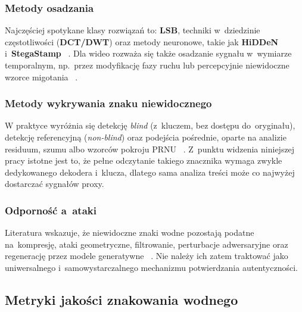 \subsubsection{Metody osadzania}
\label{sec:watermark_embed}

Najcz\k{e}\'{s}ciej spotykane klasy rozwi\k{a}za\'{n} to:
\textbf{LSB}, techniki w~dziedzinie cz\k{e}stotliwo\'{s}ci
(\textbf{DCT/DWT}) oraz metody neuronowe, takie jak
\textbf{HiDDeN} i~\textbf{StegaStamp}
~\cite{Zhu2018HiDDeN,Fernandez2024BlindWatermark}.
Dla wideo rozwa\.{z}a si\k{e} tak\.{z}e osadzanie sygna\l{}u
w~wymiarze temporalnym, np.\ przez modyfikacj\k{e} fazy ruchu
lub percepcyjnie niewidoczne wzorce migotania
~\cite{Luo2025WatermarkingAIGC}.

\subsubsection{Metody wykrywania znaku niewidocznego}
\label{sec:watermark_detect}

W praktyce wyr\'{o}\.{z}nia si\k{e} detekcj\k{e} \textit{blind}
(z~kluczem, bez dost\k{e}pu do~orygina\l{}u), detekcj\k{e} referencyjn\k{a}
(\textit{non-blind}) oraz podej\'{s}cia po\'{s}rednie, oparte na analizie
residuum, szumu albo wzorc\'{o}w pokroju PRNU
~\cite{Wang2024ReliabilityPerspective}. Z~punktu widzenia niniejszej pracy
istotne jest to, \.{z}e pe\l{}ne odczytanie takiego znacznika wymaga zwykle
dedykowanego dekodera i~klucza, dlatego sama analiza tre\'{s}ci mo\.{z}e
co najwy\.{z}ej dostarcza\'{c} sygna\l{}\'{o}w proxy.

\subsubsection{Odporno\'{s}\'{c} a~ataki}
\label{sec:watermark_attacks}

Literatura wskazuje, \.{z}e niewidoczne znaki wodne pozostaj\k{a}
podatne na~kompresj\k{e}, ataki geometryczne, filtrowanie,
perturbacje adwersaryjne oraz regeneracj\k{e} przez modele generatywne
~\cite{Zhao2023InvisibleRemovable,Piet2024SoKWatermarking}. Nie nale\.{z}y
ich zatem traktowa\'{c} jako uniwersalnego i~samowystarczalnego mechanizmu
potwierdzania autentyczno\'{s}ci.

\subsection{Metryki jako\'{s}ci znakowania wodnego}
\label{sec:watermark_metrics}

